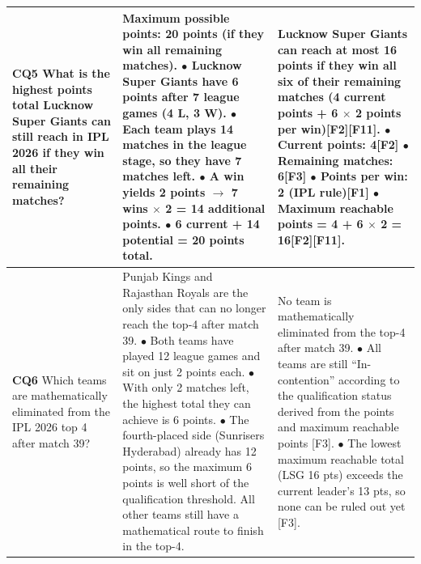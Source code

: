 \begin{longtable}{p{1.9cm}p{6.8cm}p{6.8cm}}
\textbf{CQ5} \newline \scriptsize What is the highest points total Lucknow Super Giants can still reach in IPL 2026 if they win all their remaining matches? & \scriptsize Maximum possible points: 20 points (if they win all remaining matches). \newline \quad$\bullet$ Lucknow Super Giants have 6 points after 7 league games (4 L, 3 W). \newline \quad$\bullet$ Each team plays 14 matches in the league stage, so they have 7 matches left. \newline \quad$\bullet$ A win yields 2 points $\rightarrow$ 7 wins $\times$ 2 = 14 additional points. \newline \quad$\bullet$ 6 current + 14 potential = 20 points total. & \scriptsize Lucknow Super Giants can reach at most 16 points if they win all six of their remaining matches (4 current points + 6 $\times$ 2 points per win)\textsf{[F2]}\textsf{[F11]}. \newline \quad$\bullet$ Current points: 4\textsf{[F2]} \newline \quad$\bullet$ Remaining matches: 6\textsf{[F3]} \newline \quad$\bullet$ Points per win: 2 (IPL rule)\textsf{[F1]} \newline \quad$\bullet$ Maximum reachable points = 4 + 6 $\times$ 2 = 16\textsf{[F2]}\textsf{[F11]}. \\ \midrule
\textbf{CQ6} \newline \scriptsize Which teams are mathematically eliminated from the IPL 2026 top 4 after match 39? & \scriptsize Punjab Kings and Rajasthan Royals are the only sides that can no longer reach the top-4 after match 39. \newline \quad$\bullet$ Both teams have played 12 league games and sit on just 2 points each. \newline \quad$\bullet$ With only 2 matches left, the highest total they can achieve is 6 points. \newline \quad$\bullet$ The fourth-placed side (Sunrisers Hyderabad) already has 12 points, so the maximum 6 points is well short of the qualification threshold. \newline All other teams still have a mathematical route to finish in the top-4. & \scriptsize No team is mathematically eliminated from the top-4 after match 39. \newline \quad$\bullet$ All teams are still ``In-contention'' according to the qualification status derived from the points and maximum reachable points \textsf{[F3]}. \newline \quad$\bullet$ The lowest maximum reachable total (LSG 16 pts) exceeds the current leader's 13 pts, so none can be ruled out yet \textsf{[F3]}. \\ \midrule

\end{longtable}
